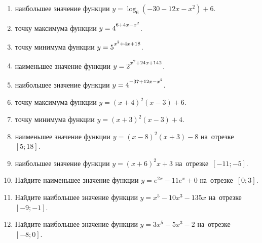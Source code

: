 \documentclass[a4paper,10pt]{article}
\begin{document}
\begin{enumerate}
\item {} наибольшее значение функции $y=\log_6\left(-30-12x-x^2\right)+6$.

\item {} точку максимума функции $y=4\strut^{6+4x-x^2}$.

\item {} точку минимума функции $y=5\strut^{x^2+4x+18}$.

\item {} наименьшее значение функции $y=2\strut^{x^2+24x+142}$.

\item {} наибольшее значение функции $y=4\strut^{-37+12x-x^2}$.

\item {} точку максимума функции $y=\left(x+4\right)^2\left(x-3\right)+6$.

\item {} точку минимума функции $y=\left(x+3\right)^2\left(x-3\right)+4$.

\item {} наименьшее значение функции $y=\left(x-8\right)^2\left(x+3\right)-8$ на~отрезке~$\left[5;18\right]$.

\item {} наибольшее значение функции $y=\left(x+6\right)^2x+3$ на~отрезке~$\left[-11;-5\right]$.

\item Найдите наименьшее значение функции $y=e^{2x}-11e^x+0$ на~отрезке~$\left[0;3\right]$.

\item Найдите наибольшее значение функции $y=x^5-10x^3-135x$ на~отрезке~$\left[-9;-1\right]$.

\item Найдите наибольшее значение функции $y=3x^5-5x^3-2$ на~отрезке~$\left[-8;0\right]$.

\end{enumerate}
\end{document}
